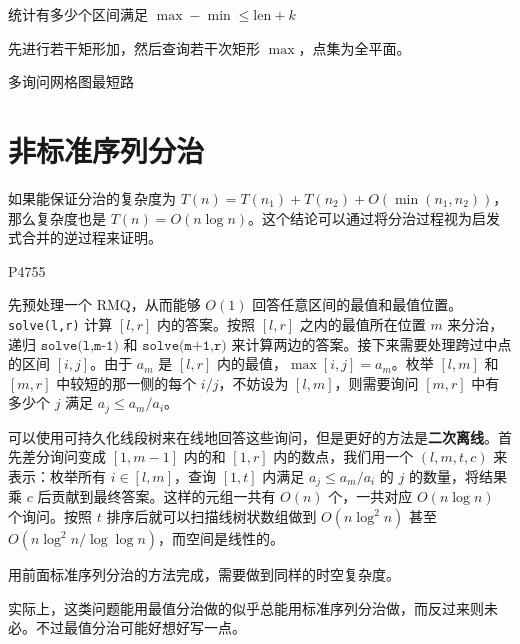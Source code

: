 \begin{exercise}
    统计有多少个区间满足 $\max-\min\le \mathrm{len}+k$
\end{exercise}

\begin{example}[P6109]
    先进行若干矩形加，然后查询若干次矩形 $\max$，点集为全平面。
\end{example}

\begin{example}[P3350]
    多询问网格图最短路
\end{example}

\section{非标准序列分治}

如果能保证分治的复杂度为 $T(n)=T(n_1)+T(n_2)+O(\min(n_1,n_2))$，那么复杂度也是 $T(n)=O(n\log n)$。这个结论可以通过将分治过程视为启发式合并的逆过程来证明。

\begin{example}
    P4755
\end{example}
\begin{solution}
    先预处理一个 RMQ，从而能够 $O(1)$ 回答任意区间的最值和最值位置。\texttt{solve(l,r)} 计算 $[l,r]$ 内的答案。按照 $[l,r]$ 之内的最值所在位置 $m$ 来分治，递归 $\texttt{solve(l,m-1)}$ 和 $\texttt{solve(m+1,r)}$ 来计算两边的答案。接下来需要处理跨过中点的区间 $[i,j]$。由于 $a_m$ 是 $[l,r]$ 内的最值，$\max [i,j]=a_m$。枚举 $[l,m]$ 和 $[m,r]$ 中较短的那一侧的每个 $i/j$，不妨设为 $[l,m]$，则需要询问 $[m,r]$ 中有多少个 $j$ 满足 $a_j\le a_m/a_i$。

    可以使用可持久化线段树来在线地回答这些询问，但是更好的方法是\textbf{二次离线}。首先差分询问变成 $[1,m-1]$ 内的和 $[1,r]$ 内的数点，我们用一个 $(l,m,t,c)$ 来表示：枚举所有 $i\in [l,m]$，查询 $[1,t]$ 内满足 $a_j\le a_m/a_i$ 的 $j$ 的数量，将结果乘 $c$ 后贡献到最终答案。这样的元组一共有 $O(n)$ 个，一共对应 $O(n\log n)$ 个询问。按照 $t$ 排序后就可以扫描线树状数组做到 $O(n\log^2 n)$ 甚至 $O(n\log^2 n/\log\log n)$，而空间是线性的。
\end{solution}
\begin{exercise}
    用前面标准序列分治的方法完成，需要做到同样的时空复杂度。
\end{exercise}
\begin{remark}
    实际上，这类问题能用最值分治做的似乎总能用标准序列分治做，而反过来则未必。不过最值分治可能好想好写一点。
\end{remark}

